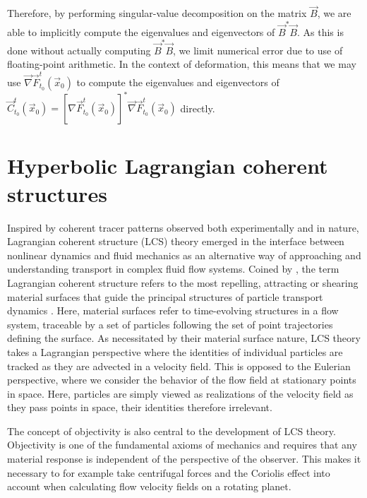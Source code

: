 Therefore, by performing singular-value decomposition on the matrix $\vec{B}$, we are able to implicitly compute the eigenvalues and eigenvectors of $\vec{B}^*\vec{B}$. As this is done without actually computing $\vec{B}^*\vec{B}$, we limit numerical error due to use of floating-point arithmetic. In the context of deformation, this means that we may use $\vec{\nabla}\vec{F}_{t_0}^{t}(\vec{x}_0)$ to compute the eigenvalues and eigenvectors of $\vec{C}_{t_0}^{t}(\vec{x}_0) = \left[ \nabla \vec{F}_{t_0}^{t}(\vec{x}_0)\right]^* \vec{\nabla}\vec{F}_{t_0}^{t}(\vec{x}_0)$ directly.
\section{Hyperbolic Lagrangian coherent structures} \label{sec:LCS}

Inspired by coherent tracer patterns observed both experimentally and in nature, Lagrangian coherent structure (LCS) theory emerged in the interface between nonlinear dynamics and fluid mechanics as an alternative way of approaching and understanding transport in complex fluid flow systems. Coined by \cite{HallerandYuan}, the term Lagrangian coherent structure refers to the most repelling, attracting or shearing material surfaces that guide the principal structures of particle transport dynamics \citep{LCSreview}. Here, material surfaces refer to time-evolving structures in a flow system, traceable by a set of particles following the set of point trajectories defining the surface. As necessitated by their material surface nature, LCS theory takes a Lagrangian perspective where the identities of individual particles are tracked as they are advected in a velocity field. This is opposed to the Eulerian perspective, where we consider the behavior of the flow field at stationary points in space. Here, particles are simply viewed as realizations of the velocity field as they pass points in space, their identities therefore irrelevant.

The concept of objectivity is also central to the development of LCS theory. Objectivity is one of the fundamental axioms of mechanics and requires that any material response is independent of the perspective of the observer. This makes it necessary to for example take centrifugal forces and the Coriolis effect into account when calculating flow velocity fields on a rotating planet. 


